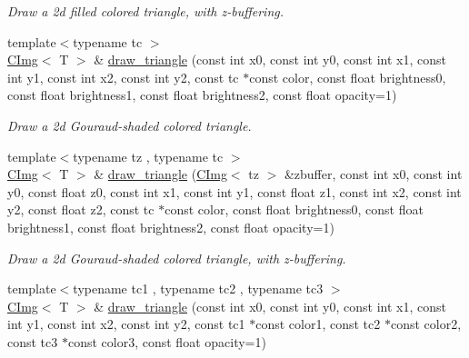\begin{DoxyCompactItemize}
\begin{DoxyCompactList}\small\item\em Draw a 2d filled colored triangle, with z-\/buffering. \item\end{DoxyCompactList}\item 
{\footnotesize template$<$typename tc $>$ }\\\hyperlink{structcimg__library_1_1CImg}{CImg}$<$ T $>$ \& \hyperlink{structcimg__library_1_1CImg_a6fedec577cb8971fed8d1f3a039d3aac}{draw\_\-triangle} (const int x0, const int y0, const int x1, const int y1, const int x2, const int y2, const tc $\ast$const color, const float brightness0, const float brightness1, const float brightness2, const float opacity=1)
\begin{DoxyCompactList}\small\item\em Draw a 2d Gouraud-\/shaded colored triangle. \item\end{DoxyCompactList}\item 
\hypertarget{structcimg__library_1_1CImg_a4a98159ef54d123cb68f55fd755c74ad}{
{\footnotesize template$<$typename tz , typename tc $>$ }\\\hyperlink{structcimg__library_1_1CImg}{CImg}$<$ T $>$ \& \hyperlink{structcimg__library_1_1CImg_a4a98159ef54d123cb68f55fd755c74ad}{draw\_\-triangle} (\hyperlink{structcimg__library_1_1CImg}{CImg}$<$ tz $>$ \&zbuffer, const int x0, const int y0, const float z0, const int x1, const int y1, const float z1, const int x2, const int y2, const float z2, const tc $\ast$const color, const float brightness0, const float brightness1, const float brightness2, const float opacity=1)}
\label{structcimg__library_1_1CImg_a4a98159ef54d123cb68f55fd755c74ad}

\begin{DoxyCompactList}\small\item\em Draw a 2d Gouraud-\/shaded colored triangle, with z-\/buffering. \item\end{DoxyCompactList}\item 
\hypertarget{structcimg__library_1_1CImg_adf2a7d16acf72c77108364959c3465ee}{
{\footnotesize template$<$typename tc1 , typename tc2 , typename tc3 $>$ }\\\hyperlink{structcimg__library_1_1CImg}{CImg}$<$ T $>$ \& \hyperlink{structcimg__library_1_1CImg_adf2a7d16acf72c77108364959c3465ee}{draw\_\-triangle} (const int x0, const int y0, const int x1, const int y1, const int x2, const int y2, const tc1 $\ast$const color1, const tc2 $\ast$const color2, const tc3 $\ast$const color3, const float opacity=1)}
\label{structcimg__library_1_1CImg_adf2a7d16acf72c77108364959c3465ee}


\end{DoxyCompactItemize}
